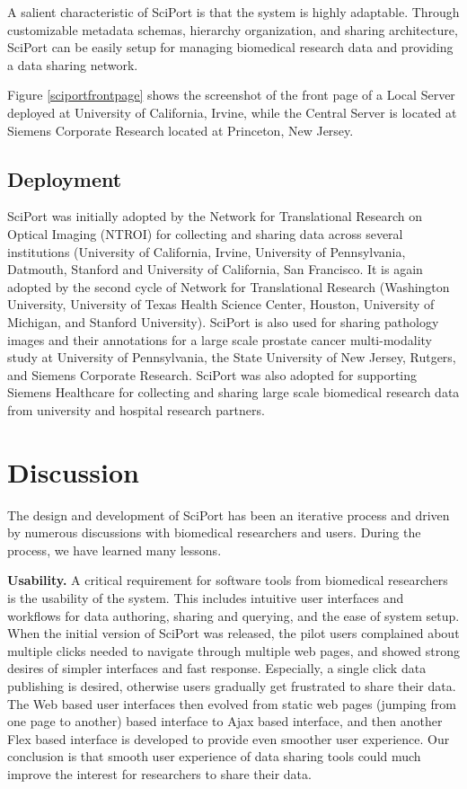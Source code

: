 \documentclass{singlecol-new}
\theoremstyle{TH}{
\newtheorem{lemma}{Lemma}
\newtheorem{theorem}[lemma]{Theorem}
\newtheorem{corrolary}[lemma]{Corrolary}
\newtheorem{conjecture}[lemma]{Conjecture}
\newtheorem{proposition}[lemma]{Proposition}
\newtheorem{claim}[lemma]{Claim}
\newtheorem{stheorem}[lemma]{Wrong Theorem}
\newtheorem{algorithm}{Algorithm}
}
\theoremstyle{THrm}{
\newtheorem{definition}{Definition}[section]
\newtheorem{question}{Question}[section]
\newtheorem{remark}{Remark}
\newtheorem{scheme}{Scheme}
}
\theoremstyle{THhit}{
\newtheorem{case}{Case}[section]
}
\begin{document}
A salient characteristic of SciPort is that the system is highly
adaptable. Through customizable metadata schemas, hierarchy
organization, and sharing architecture, SciPort can be easily setup
for managing biomedical research data and providing a data sharing
network.

Figure \ref{sciportfrontpage} shows the screenshot of the front page
of a Local Server deployed at University of California, Irvine,
while the Central Server is located at Siemens Corporate Research
located at Princeton, New Jersey.

\subsection{Deployment}

SciPort was initially adopted by the Network for Translational
Research on Optical Imaging (NTROI) for collecting and sharing data
across several institutions (University of California, Irvine,
University of Pennsylvania, Datmouth, Stanford and University of
California, San Francisco. It is again adopted by the second cycle
of Network for Translational Research (Washington University,
University of Texas Health Science Center, Houston, University of
Michigan, and Stanford University).  SciPort is also used for
sharing pathology images and their annotations for a large scale
prostate cancer multi-modality study at University of Pennsylvania,
the State University of New Jersey, Rutgers, and Siemens Corporate
Research.  SciPort was also adopted for supporting Siemens
Healthcare for collecting and sharing large scale biomedical
research data from university and hospital research partners.

\section{Discussion}

The design and development of SciPort has been an iterative process
and driven by numerous discussions with biomedical researchers and
users. During the process, we have learned many lessons.


\textbf{Usability.}  A critical requirement for software tools from
biomedical researchers is the usability of the system. This includes
intuitive user interfaces and workflows for data authoring, sharing
and querying, and the ease of system setup. When the initial version
of SciPort was released, the pilot users complained about multiple
clicks needed to navigate through multiple web pages, and showed
strong desires of simpler interfaces and fast response. Especially,
a single click data publishing is desired, otherwise users gradually
get frustrated to share their data.   The Web based user interfaces
then evolved from static web pages (jumping from one page to
another) based interface to Ajax based interface, and then another
Flex based interface is developed to provide even smoother user
experience. Our conclusion is that smooth user experience of data
sharing tools could much improve the interest for researchers to
share their data.
\end{document}
